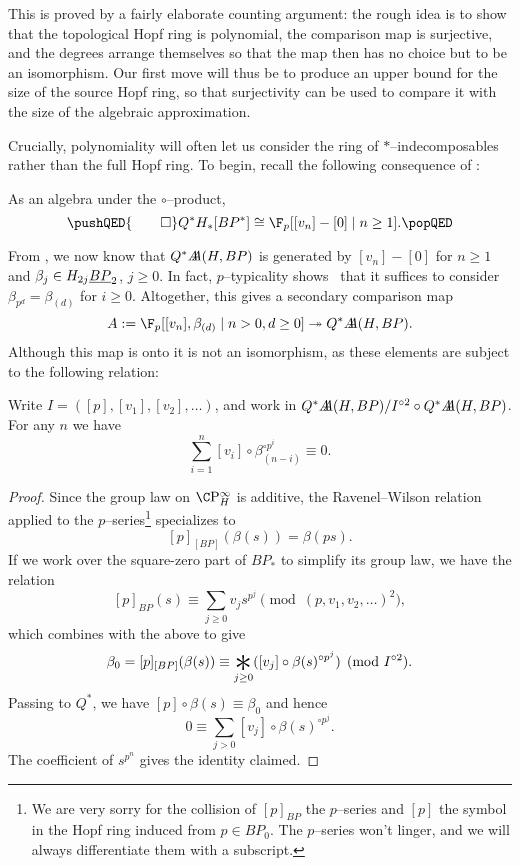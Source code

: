 \noindent This is proved by a fairly elaborate counting argument: the rough idea is to show that the topological Hopf ring is polynomial, the comparison map is surjective, and the degrees arrange themselves so that the map then has no choice but to be an isomorphism.  Our first move will thus be to produce an upper bound for the size of the source Hopf ring, so that surjectivity can be used to compare it with the size of the algebraic approximation.

Crucially, polynomiality will often let us consider the ring of $\ast$--indecomposables rather than the full Hopf ring.  To begin, recall the following consequence of :

\begin{corollary}
As an algebra under the $\circ$--product,
\[\pushQED{\qed}
Q^* H_*[BP^*] \cong \F_p[[v_n] - [0] \mid n \ge 1]. \qedhere
\popQED\]
\end{corollary}

\noindent From , we now know that $Q^* \AA(H, BP)$ is generated by $[v_n] - [0]$ for $n \ge 1$ and $\beta_j \in H_{2j} \OS{BP}{2}$, $j \ge 0$.  In fact, $p$--typicality shows~\cite[Lemma 4.14]{RavenelWilsonHopfRingForMU} that it suffices to consider $\beta_{p^d} = \beta_{(d)}$ for $i \ge 0$.  Altogether, this gives a secondary comparison map \[A := \F_p[[v_n], \beta_{(d)} \mid n > 0, d \ge 0] \onto Q^* \AA(H, BP).\]  Although this map is onto it is not an isomorphism, as these elements are subject to the following relation:

\begin{lemma}
Write $I = ([p], [v_1], [v_2], \ldots)$, and work in $Q^* \AA(H, BP) / I^{\circ 2} \circ Q^* \AA(H, BP)$.  For any $n$ we have \[\sum_{i=1}^n [v_i] \circ \beta_{(n-i)}^{\circ p^i} \equiv 0.\]
\end{lemma}
\begin{proof}
Since the group law on $\CP^\infty_H$ is additive, the Ravenel--Wilson relation applied to the $p$--series\footnote{We are very sorry for the collision of $[p]_{BP}$ the $p$--series and $[p]$ the symbol in the Hopf ring induced from $p \in BP_0$.  The $p$--series won't linger, and we will always differentiate them with a subscript.} specializes to \[[p]_{[BP]}(\beta(s)) = \beta(ps).\]  If we work over the square-zero part of $BP_*$ to simplify its group law, we have the relation \[[p]_{BP}(s) \equiv \sum_{j \ge 0} v_j s^{p^j} \pmod{(p, v_1, v_2, \ldots)^2},\] which combines with the above to give \[\beta_0 = [p]_{[BP]}(\beta(s)) \equiv \bigast_{j \ge 0} ([v_j] \circ \beta(s)^{\circ p^j}) \pmod{I^{\circ 2}}.\]  Passing to $Q^*$, we have $[p] \circ \beta(s) \equiv \beta_0$ and hence \[0 \equiv \sum_{j > 0} [v_j] \circ \beta(s)^{\circ p^j}.\]  The coefficient of $s^{p^n}$ gives the identity claimed.
\end{proof}

